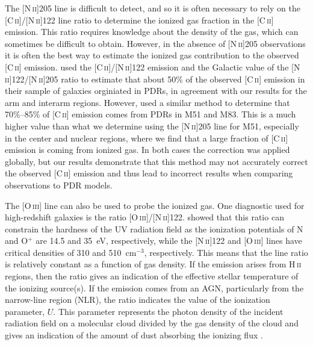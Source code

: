 The [N\,\textsc{ii}]205 line is difficult to detect, and so it is often necessary to rely on the [C\,\textsc{ii}]/[N\,\textsc{ii}]122 line ratio to determine the ionized gas fraction in the [C\,\textsc{ii}] emission.  This ratio requires knowledge about the density of the gas, which can sometimes be difficult to obtain.  However, in the absence of [N\,\textsc{ii}]205 observations it is often the best way to estimate the ionized gas contribution to the observed [C\,\textsc{ii}] emission.  \citet{2001ApJ...561..766M} used the [C\,\textsc{ii}]/[N\,\textsc{ii}]122 emission and the Galactic value of the [N\,\textsc{ii}]122/[N\,\textsc{ii}]205 ratio to estimate that about 50\% of the observed [C\,\textsc{ii}] emission in their sample of galaxies orginiated in PDRs, in agreement with our results for the arm and interarm regions.  However, \citet{2005A&A...441..961K} used a similar method to determine that 70\%--85\% of [C\,\textsc{ii}] emission comes from PDRs in M51 and M83.  This is a much higher value than what we determine using the [N\,\textsc{ii}]205 line for M51, especially in the center and nuclear regions, where we find that a large fraction of [C\,\textsc{ii}] emission is coming from ionized gas.  In both cases the correction was applied globally, but our results demonstrate that this method may not accurately correct the observed [C\,\textsc{ii}] emission and thus lead to incorrect results when comparing observations to PDR models.

The [O\,\textsc{iii}] line can also be used to probe the ionized gas.  One diagnostic used for high-redshift galaxies is the ratio [O\,\textsc{iii}]/[N\,\textsc{ii}]122.  \citet{2011ApJ...740L..29F} showed that this ratio can constrain the hardness of the UV radiation field as the ionization potentials of N and O$^{+}$ are 14.5 and 35~eV, respectively, while the [N\,\textsc{ii}]122 and [O\,\textsc{iii}] lines have critical densities of 310 and 510~cm$^{-3}$, respectively.  This means that the line ratio is relatively constant as a function of gas density.  If the emission arises from H\,\textsc{ii} regions, then the ratio gives an indication of the effective stellar temperature of the ionizing source(s).  If the emission comes from an AGN, particularly from the narrow-line region (NLR), the ratio indicates the value of the ionization parameter, $U$.  This parameter represents the photon density of the incident radiation field on a molecular cloud divided by the gas density of the cloud and gives an indication of the amount of dust absorbing the ionizing flux \citep{2003ApJ...594..758L,2009ApJ...701.1147A}.

